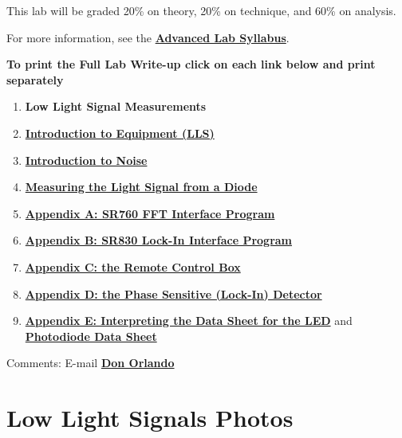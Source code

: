 \documentclass{../lab}
\begin{document}
\noindent This lab will be graded 20\% on theory, 20\% on technique, and 60\% on analysis.

\noindent For more information, see the \href{\AdvancedLabSyllabus}{\textbf{Advanced Lab Syllabus}}.

\noindent\textbf{To print the Full Lab Write-up click on each link below and print separately}

\begin{enumerate}
    \item \textbf{Low Light Signal Measurements}

    \item \href{http://experimentationlab.berkeley.edu/IntroductiontoEquipment}{\textbf{Introduction to Equipment (LLS)}}

    \item \href{http://experimentationlab.berkeley.edu/IntroductiontoNoise}{\textbf{Introduction to Noise}}

    \item \href{http://experimentationlab.berkeley.edu/LightSignal}{\textbf{Measuring the Light Signal from a Diode}}

    \item \href{http://experimentationlab.berkeley.edu/node/96}{\textbf{Appendix A: SR760 FFT Interface Program}}

    \item \href{http://experimentationlab.berkeley.edu/node/97}{\textbf{Appendix B: SR830 Lock-In Interface Program}}

    \item \href{http://experimentationlab.berkeley.edu/node/98}{\textbf{Appendix C: the Remote Control Box}}

    \item \href{http://experimentationlab.berkeley.edu/node/99}{\textbf{Appendix D: the Phase Sensitive (Lock-In) Detector}}

    \item \href{http://experimentationlab.berkeley.edu/node/100}{\textbf{Appendix E: Interpreting the Data Sheet for the LED}} and \href{http://experimentationlab.berkeley.edu/node/101}{\textbf{Photodiode Data Sheet}}

\end{enumerate}

\noindent Comments: E-mail \href{\MailDonOrlando}{\textbf{Don Orlando}}

\section{Low Light Signals Photos}
\end{document}
